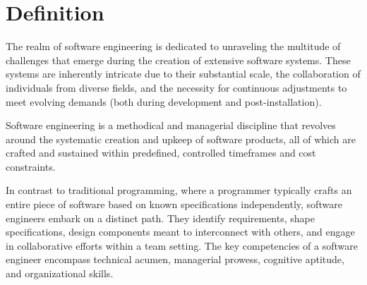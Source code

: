 \section{Definition}

The realm of software engineering is dedicated to unraveling the multitude of challenges that emerge during the creation of extensive software systems.
These systems are inherently intricate due to their substantial scale, the collaboration of individuals from diverse fields, and the necessity for continuous adjustments to meet evolving demands (both during development and post-installation). 

\begin{definition}
    Software engineering is a methodical and managerial discipline that revolves around the systematic creation and upkeep of software products, all of which are crafted and sustained within predefined, controlled timeframes and cost constraints.
\end{definition}

In contrast to traditional programming, where a programmer typically crafts an entire piece of software based on known specifications independently, software engineers embark on a distinct path.
They identify requirements, shape specifications, design components meant to interconnect with others, and engage in collaborative efforts within a team setting. 
The key competencies of a software engineer encompass technical acumen, managerial prowess, cognitive aptitude, and organizational skills.